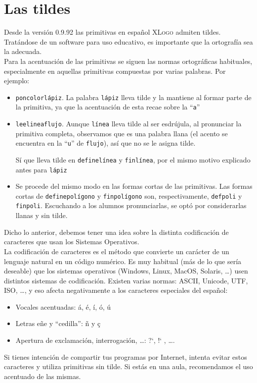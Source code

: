 \section{Las tildes}

Desde la versi\'on 0.9.92 las primitivas en espa\~nol \textsc{XLogo} admiten
tildes. Trat\'andose de un software para uso educativo, es importante que la
ortograf\'ia sea la adecuada.\\

\noindent Para la acentuaci\'on de las primitivas se siguen las normas
ortogr\'aficas habituales, especialmente en aquellas primitivas compuestas
por varias palabras. Por ejemplo:
\begin{itemize}
   \item \texttt{poncolorl\'apiz}. La palabra \texttt{l\'apiz} lleva tilde
      y la mantiene al formar parte de la primitiva, ya que la acentuaci\'on
      de esta recae sobre la ``\texttt{a}'' 
   \item \texttt{leelineaflujo}. Aunque \texttt{l\'inea} lleva tilde al ser
      esdr\'ujula, al pronunciar la primitiva completa, observamos que es
      una palabra llana (el acento se encuentra en la ``\texttt{u}'' de
      \texttt{flujo}), as\'i que no se le asigna tilde.

      S\'i que lleva tilde en \texttt{definel\'inea} y \texttt{finl\'inea},
      por el mismo motivo explicado antes para \texttt{l\'apiz}
   \item Se procede del mismo modo en las formas cortas de las primitivas.
      Las formas cortas de \texttt{definepol\'igono} y \texttt{finpol\'igono}
      son, respectivamente, \texttt{defpoli} y \texttt{finpoli}.
      Escuchando a los alumnos pronunciarlas, se opt\'o por considerarlas
      llanas y sin tilde.
\end{itemize}

Dicho lo anterior, debemos tener una idea sobre la distinta codificaci\'on
de caracteres que usan los Sistemas Operativos. \\

La codificaci\'on de caracteres es el m\'etodo que convierte un car\'acter de
un lenguaje natural en un c\'odigo num\'erico. Es muy habitual (m\'as de lo
que ser\'ia deseable) que los sistemas operativos (Windows, Linux, MacOS,
Solaris, \ldots) usen distintos sistemas de codificaci\'on. Existen varias
normas: ASCII, Unicode, UTF, ISO, \ldots, y eso afecta negativamente a los
caracteres especiales del espa\~nol:
\begin{itemize}
   \item Vocales acentuadas: \'a, \'e, \'i, \'o, \'u
   \item Letras e\~ne y ``cedilla'': \~n y \c{c}
   \item Apertura de exclamaci\'on, interrogaci\'on, \ldots: ?`, !` , \ldots.
\end{itemize}

Si tienes intenci\'on de compartir tus programas por Internet, intenta evitar
estos caracteres y utiliza primitivas sin tilde. Si est\'as en una aula,
recomendamos el uso acentuado de las mismas.